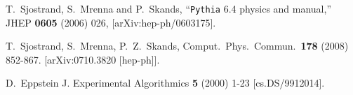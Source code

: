 \documentclass[12pt,a4]{article}
\begin{document}
\begin{thebibliography}{99}
  T.~Sjostrand, S.~Mrenna and P.~Skands,
  ``{\tt Pythia} 6.4 physics and manual,''
  JHEP {\bf 0605} (2006) 026,
  [arXiv:hep-ph/0603175].

  T.~Sjostrand, S.~Mrenna, P.~Z.~Skands,
  Comput.\ Phys.\ Commun.\  {\bf 178 } (2008)  852-867.
  [arXiv:0710.3820 [hep-ph]].

  D.~Eppstein
  J. Experimental Algorithmics {\bf 5} (2000) 1-23 [cs.DS/9912014].



\end{thebibliography}
\end{document}
